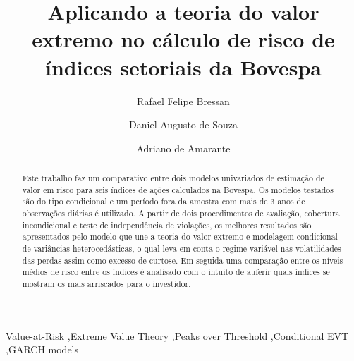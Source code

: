 \documentclass[1p]{elsarticle}
\theoremstyle{definition}
\begin{document}
	
\begin{frontmatter}

\title{Aplicando a teoria do valor extremo no cálculo de risco de índices setoriais da Bovespa}




\author[mymainaddress]{Rafael Felipe Bressan}
%
\author[mymainaddress]{Daniel Augusto de Souza}
\author[mymainaddress]{Adriano de Amarante}

\address[mymainaddress]{Avenida Madre Benvenuta, 2007 - Santa Mônica Florianópolis - SC 88035-901}


\begin{abstract}
	Este trabalho faz um comparativo entre dois modelos univariados de estimação de valor em risco para seis índices de ações calculados na Bovespa. Os modelos testados são do tipo condicional e um período fora da amostra com mais de 3 anos de observações diárias é utilizado. A partir de dois procedimentos de avaliação, cobertura incondicional e teste de independência de violações, os melhores resultados são apresentados pelo modelo que une a teoria do valor extremo e modelagem condicional de variâncias heterocedásticas, o qual leva em conta o regime variável nas volatilidades das perdas assim como excesso de curtose. Em seguida uma comparação entre os níveis médios de risco entre os índices é analisado com o intuito de auferir quais índices se mostram os mais arriscados para o investidor.
\end{abstract}

\begin{keyword}
Value-at-Risk \sep Extreme Value Theory \sep Peaks over Threshold \sep Conditional EVT \sep GARCH models
\end{keyword}

\end{frontmatter}
\end{document}
